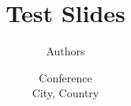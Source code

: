 \documentclass[usenames,dvipsnames]{beamer}
\title[test]{Test Slides}
\author[xxx \etal]{Authors \inst{1}}
\institute[]{
  	\inst{1} Nanyang Technological University, Singapore \\
}
\date[conf.]{Conference \\ City, Country}
\begin{document}
\begin{frame}
  \titlepage
\end{frame}
\end{document}
